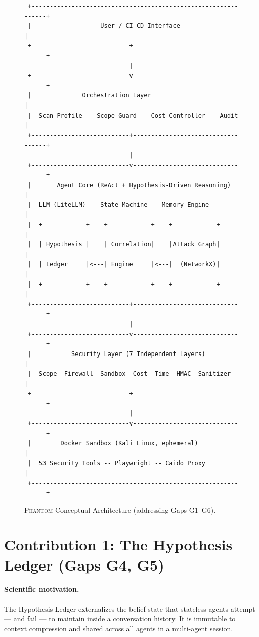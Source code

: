 \documentclass[12pt,a4paper,oneside,openany]{book}
\newcommand{\Phantom}{\textsc{Phantom}}
\begin{document}
\begin{figure}[H]
\centering
\begin{minipage}{0.9\textwidth}
\begin{verbatim}
 +---------------------------------------------------------------+
 |                   User / CI-CD Interface                       |
 +---------------------------+-----------------------------------+
                             |
 +---------------------------v-----------------------------------+
 |              Orchestration Layer                               |
 |  Scan Profile -- Scope Guard -- Cost Controller -- Audit       |
 +---------------------------+-----------------------------------+
                             |
 +---------------------------v-----------------------------------+
 |       Agent Core (ReAct + Hypothesis-Driven Reasoning)        |
 |  LLM (LiteLLM) -- State Machine -- Memory Engine              |
 |  +------------+    +------------+    +------------+           |
 |  | Hypothesis |    | Correlation|    |Attack Graph|           |
 |  | Ledger     |<---| Engine     |<---|  (NetworkX)|           |
 |  +------------+    +------------+    +------------+           |
 +---------------------------+-----------------------------------+
                             |
 +---------------------------v-----------------------------------+
 |           Security Layer (7 Independent Layers)               |
 |  Scope--Firewall--Sandbox--Cost--Time--HMAC--Sanitizer        |
 +---------------------------+-----------------------------------+
                             |
 +---------------------------v-----------------------------------+
 |        Docker Sandbox (Kali Linux, ephemeral)                 |
 |  53 Security Tools -- Playwright -- Caido Proxy               |
 +---------------------------------------------------------------+
\end{verbatim}
\end{minipage}
\caption{\Phantom{} Conceptual Architecture (addressing Gaps G1--G6).}
\label{fig:architecture}
\end{figure}

\section{Contribution 1: The Hypothesis Ledger (Gaps G4, G5)}
\label{sec:ledger}

\paragraph{Scientific motivation.}
The Hypothesis Ledger externalizes the belief state that stateless agents attempt — and fail — to maintain inside a conversation history. It is immutable to context compression and shared across all agents in a multi-agent session.
\end{document}
